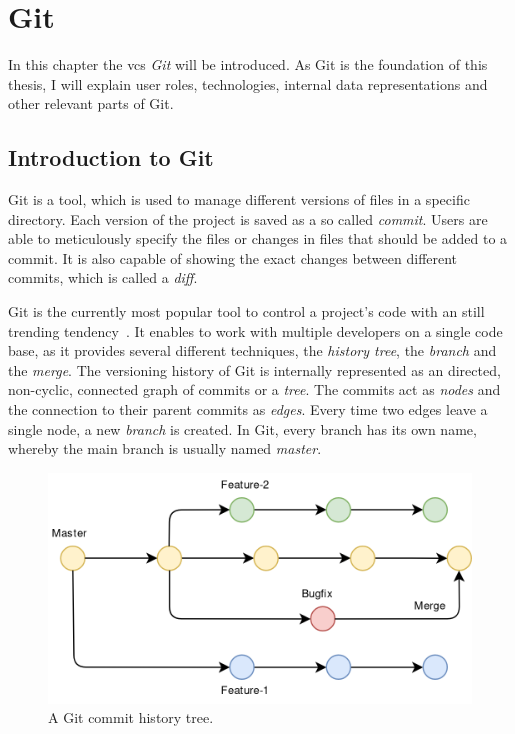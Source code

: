 \chapter{Git}\label{git-explanation}
In this chapter the \ac{vcs} \emph{Git} will be introduced.
As Git is the foundation of this thesis, I will explain user roles, technologies, internal data representations and other relevant parts of Git.


\section{Introduction to Git}\label{git-introduction}
Git is a tool, which is used to manage different versions of files in a specific directory.
Each version of the project is saved as a so called \emph{commit}.
Users are able to meticulously specify the files or changes in files that should be added to a commit.
It is also capable of showing the exact changes between different commits, which is called a \emph{diff}.

Git is the currently most popular tool to control a project's code with an still trending tendency~\cite{article:git-popularity}.
It enables to work with multiple developers on a single code base, as it provides several different techniques, the \emph{history tree}, the \emph{branch} and the \emph{merge}.
The versioning history of Git is internally represented as an directed, non-cyclic, connected graph of commits or a \emph{tree}.
The commits act as \emph{nodes} and the connection to their parent commits as \emph{edges}.
Every time two edges leave a single node, a new \emph{branch} is created.
In Git, every branch has its own name, whereby the main branch is usually named \emph{master}.

\begin{figure}[H]
    \includegraphics[scale=0.35]{./graphs/git-history-branch}
    \centering
    \caption{A Git commit history tree.}\label{fig:git-commit-tree}
\end{figure}

